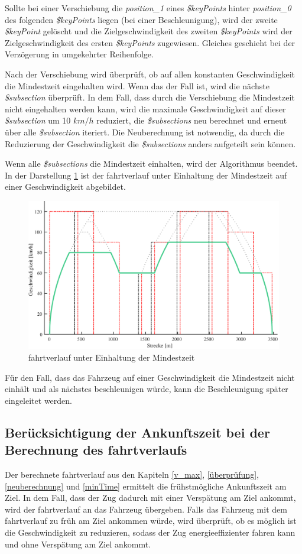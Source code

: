 Sollte bei einer Verschiebung die \textit{position\_1} eines \textit{\$keyPoints} hinter \textit{position\_0} des folgenden \textit{\$keyPoints} liegen (bei einer Beschleunigung), wird der zweite \textit{\$keyPoint} gelöscht und die Zielgeschwindigkeit des zweiten \textit{\$keyPoints} wird der Zielgeschwindigkeit des ersten \textit{\$keyPoints} zugewiesen. Gleiches geschieht bei der Verzögerung in umgekehrter Reihenfolge. 

Nach der Verschiebung wird überprüft, ob auf allen konstanten Geschwindigkeit die Mindestzeit eingehalten wird. Wenn das der Fall ist, wird die nächste \textit{\$subsection} überprüft. In dem Fall, dass durch die Verschiebung die Mindestzeit nicht eingehalten werden kann, wird die maximale Geschwindigkeit auf dieser \textit{\$subsection} um 10 $km/h$ reduziert, die \textit{\$subsections} neu berechnet und erneut über alle \textit{\$subsection} iteriert. Die Neuberechnung ist notwendig, da durch die Reduzierung der Geschwindigkeit die \textit{\$subsections} anders aufgeteilt sein können.

Wenn alle \textit{\$subsections} die Mindestzeit einhalten, wird der Algorithmus beendet. In der Darstellung \ref{fig:it9} ist der \Gls{fahrtverlauf} unter Einhaltung der Mindestzeit auf einer Geschwindigkeit abgebildet.
\begin{figure}
\includegraphics[width=\linewidth]{../images/matlab/it9.pdf}
\caption{\Gls{fahrtverlauf} unter Einhaltung der Mindestzeit}
\label{fig:it9}
\end{figure}
Für den Fall, dass das Fahrzeug auf einer Geschwindigkeit die Mindestzeit nicht einhält und als nächstes beschleunigen würde, kann die Beschleunigung später eingeleitet werden. 

\subsection{Berücksichtigung der Ankunftszeit bei der Berechnung des \Gls{fahrtverlauf}s} \label{time}
Der berechnete \Gls{fahrtverlauf} aus den Kapiteln \ref{v_max}, \ref{überprüfung}, \ref{neuberechnung} und \ref{minTime} ermittelt die frühstmögliche Ankunftszeit am Ziel. In dem Fall, dass der Zug dadurch mit einer Verspätung am Ziel ankommt, wird der \Gls{fahrtverlauf} an das Fahrzeug übergeben. Falls das Fahrzeug mit dem \Gls{fahrtverlauf} zu früh am Ziel ankommen würde, wird überprüft, ob es möglich ist die Geschwindigkeit zu reduzieren, sodass der Zug energieeffizienter fahren kann und ohne Verspätung am Ziel ankommt. 

